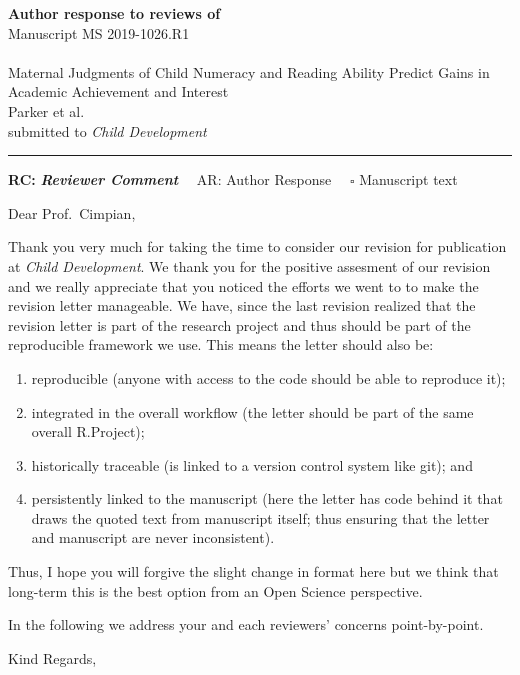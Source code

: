 \documentclass[draft]{article}
\providecommand{\tightlist}{%
  \setlength{\itemsep}{0pt}\setlength{\parskip}{0pt}}
\begin{document}
{\Large\bf Author response to reviews of}\\[1em]
Manuscript MS 2019-1026.R1\\ \\
{\Large Maternal Judgments of Child Numeracy and Reading Ability Predict Gains in Academic Achievement and Interest}\\[1em]
{Parker et al.}\\
{submitted to \it Child Development }\\
\hrule

\hfill {\bfseries RC:} \textbf{\textit{Reviewer Comment}}\(\quad\) AR: Author Response \(\quad\square\) Manuscript text

\vspace{2em}

Dear Prof.~Cimpian,


Thank you very much for taking the time to consider our revision for publication at \emph{Child Development}. We thank you for the positive assesment of our revision and we really appreciate that you noticed the efforts we went to to make the revision letter manageable. We have, since the last revision realized that the revision letter is part of the research project and thus should be part of the reproducible framework we use. This means the letter should also be:

\begin{enumerate}
\def\labelenumi{\arabic{enumi}.}
\tightlist
\item
  reproducible (anyone with access to the code should be able to reproduce it);
\item
  integrated in the overall workflow (the letter should be part of the same overall R.Project);
\item
  historically traceable (is linked to a version control system like git); and
\item
  persistently linked to the manuscript (here the letter has code behind it that draws the quoted text from manuscript itself; thus ensuring that the letter and manuscript are never inconsistent).
\end{enumerate}

Thus, I hope you will forgive the slight change in format here but we think that long-term this is the best option from an Open Science perspective.

In the following we address your and each reviewers' concerns point-by-point.

Kind Regards,
\end{document}
